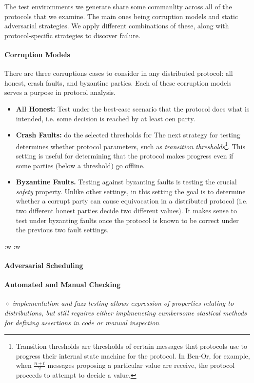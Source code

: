 The test enviromments we generate share some commanlity across all of the protocols that we examine.
The main ones being corruption models and static adversarial strategies.
We apply different combinations of these, along with protocol-specific strategies to discover failure.

\paragraph{Corruption Models}
There are three corruptions cases to consider in any distributed protocol: all honest, crash faults, and byzantine parties.
Each of these corruption models serves a purpose in protocol analysis.
\begin{itemize}
  \item \textbf{All Honest:} Test under the best-case scenario that the protocol does what is intended, i.e. some decision is reached by at least oen party.
  \item \textbf{Crash Faults:} do the selected thresholds for 
  The next strategy for testing determines whether protocol parameters, such as \emph{transition thresholds}\footnote{Transition thresholds are thresholds of certain messages that protocols use to progress their internal state machine for the protocol. In Ben-Or, for example, when $\frac{n+t}{2}$ messages proposing a particular value are receive, the protocol proceeds to attempt to decide a value.}. This setting is useful for determining that the protocol makes progress even if some parties (below a threshold) go offline.
  \item \textbf{Byzantine Faults.} Testing against byzanting faults is testing the crucial \emph{safety} property. Unlike other settings, in this setting the goal is to determine whether a corrupt party can cause equivocation in a distributed protocol (i.e. two different honest parties decide two different values). It makes sense to test under byzanting faults once the protocol is known to be correct under the previous two fault settings. 
\end{itemize}


:w
:w
\paragraph{Adversarial Scheduling}

\paragraph{Automated and Manual Checking}
\begin{center}
\emph{$\diamond$ implementation and fuzz testing allows expression of properties relating to distributions, but still requires either implmeneting cumbersome stastical methods for defining assertions in code or manual inspection}
\end{center}


